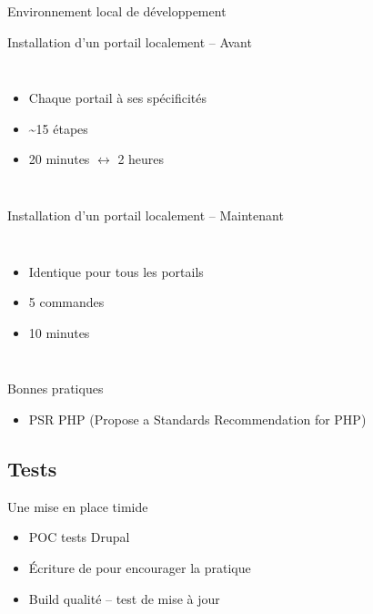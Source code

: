 \begin{frame}{Environnement local de développement}
	\begin{overprint}
		\begin{block}{Installation d'un portail localement -- Avant}
			\begin{columns}[onlytextwidth]
				\begin{itemize}
					\item Chaque portail à ses spécificités
					\item \textasciitilde 15 étapes
					\item 20 minutes $\longleftrightarrow$ 2 heures
				\end{itemize}
			\end{columns}
		\end{block}
		\begin{block}{Installation d'un portail localement -- Maintenant}
			\begin{columns}[onlytextwidth]
				\begin{itemize}
					\item Identique pour tous les portails
					\item 5 commandes
					\item 10 minutes
				\end{itemize}
			\end{columns}
		\end{block}
		\begin{block}{Bonnes pratiques}
			\begin{itemize}
				\item PSR PHP (Propose a Standards Recommendation for PHP)
			\end{itemize}
		\end{block}
	\end{overprint}
\end{frame}

\subsection{Tests}
\begin{frame}{\subsecname}
	\begin{block}{Une mise en place timide}
		\begin{itemize}
			\item POC tests Drupal
			\item Écriture de  pour encourager la pratique
			\item Build qualité -- test de mise à jour
		\end{itemize}
	\end{block}
\end{frame}

